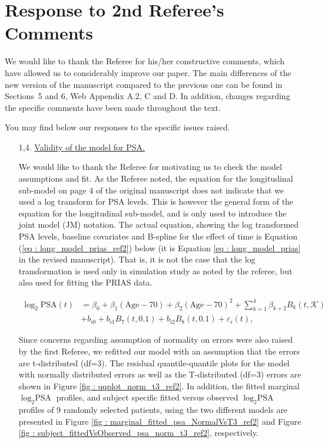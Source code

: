 \clearpage
\section*{Response to 2nd Referee's Comments}
We would like to thank the Referee for his/her constructive comments, which have allowed us to considerably improve our paper. The main differences of the new version of the manuscript compared to the previous one can be found in Sections~5 and 6, Web Appendix A.2, C and D. In addition, changes regarding the specific comments have been made throughout the text.

You may find below our responses to the specific issues raised.

\begin{enumerate}
    \item [1,4.] \underline{Validity of the model for PSA.}

    We would like to thank the Referee for motivating us to check the model assumptions and fit. As the Referee noted, the equation for the longitudinal sub-model on page 4 of the original manuscript does not indicate that we used a log transform for PSA levels. This is however the general form of the equation for the longitudinal sub-model, and is only used to introduce the joint model (JM) notation. The actual equation, showing the log transformed PSA levels, baseline covariates and B-spline for the effect of time is Equation (\ref{eq : long_model_prias_ref2}) below (it is Equation \ref{eq : long_model_prias} in the revised manuscript). That is, it is not the case that the log transformation is used only in simulation study as noted by the referee, but also used for fitting the PRIAS data. 

    \begin{equation}
\label{eq : long_model_prias_ref2}
\begin{aligned}
\log_2 \mbox{PSA}(t) &= \beta_0 + \beta_1 (\mbox{Age}-70) + \beta_2 (\mbox{Age}-70)^2 + \sum_{k=1}^4 \beta_{k+2} B_k(t,\mathcal{K})\\ 
&+  b_{i0} + b_{i1} B_7(t, 0.1) + b_{i2} B_8(t, 0.1) +
\varepsilon_i(t),
\end{aligned}
\end{equation}

    Since concerns regarding assumption of normality on errors were also raised by the first Referee, we refitted our model with an assumption that the errors are t-distributed (df=3). The residual quantile-quantile plots for the model with normally distributed errors as well as the T-distributed (df=3) errors are shown in Figure \ref{fig : qqplot_norm_t3_ref2}. In addition, the fitted marginal $\log_2 \mbox{PSA}$ profiles, and subject specific fitted versus observed $\log_2 \mbox{PSA}$ profiles of 9 randomly selected patients, using the two different models are presented in Figure \ref{fig : marginal_fitted_psa_NormalVsT3_ref2} and Figure \ref{fig : subject_fittedVsObserved_psa_norm_t3_ref2}, respectively.


\end{enumerate}
